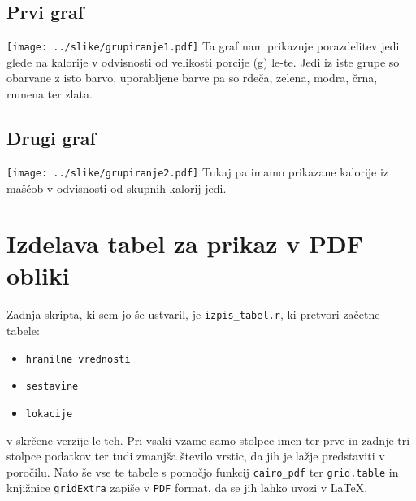 \documentclass[11pt,a4paper]{article}
\begin{document}
\subsection{Prvi graf}
\texttt{[image: ../slike/grupiranje1.pdf]}
Ta graf nam prikazuje porazdelitev jedi glede na kalorije v odvisnosti od velikosti porcije (g) le-te. Jedi iz iste grupe so obarvane z isto barvo, uporabljene barve pa so rdeča, zelena, modra, črna, rumena ter zlata.

\subsection{Drugi graf}
\texttt{[image: ../slike/grupiranje2.pdf]}
Tukaj pa imamo prikazane kalorije iz maščob v odvisnosti od skupnih kalorij jedi.

\begin{figure}
\end{figure}

\newpage
\section{Izdelava tabel za prikaz v PDF obliki}

Zadnja skripta, ki sem jo še ustvaril, je \verb|izpis_tabel.r|, ki pretvori začetne tabele:

\begin{itemize}
	\item \verb|hranilne vrednosti|
	\item \verb|sestavine|
	\item \verb|lokacije|
\end{itemize}

\noindent
v skrčene verzije le-teh. Pri vsaki vzame samo stolpec imen ter prve in zadnje tri stolpce podatkov ter tudi zmanjša število vrstic, da jih je lažje predstaviti v poročilu. Nato še vse te tabele s pomočjo funkcij \verb|cairo_pdf| ter \verb|grid.table| in knjižnice \verb|gridExtra| zapiše v \verb|PDF| format, da se jih lahko uvozi v \LaTeX.
\end{document}
